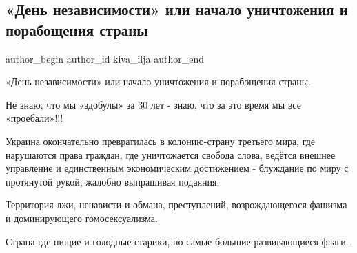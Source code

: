  
 
 
 
 
 
\subsection{«День независимости» или начало уничтожения и порабощения страны}
\label{sec:23_08_2021.fb.kiva_ilja.1.nezavisimost_poraboschenie}
 
\ifcmt
 author_begin
   author_id kiva_ilja
 author_end
\fi

«День независимости» или начало уничтожения и порабощения страны. 

Не знаю, что мы «здобулы» за 30 лет - знаю, что за это время мы все
«проебали»!!!

Украина окончательно превратилась в колонию-страну третьего мира, где
нарушаются  права граждан, где уничтожается  свобода слова, ведётся внешнее
управление и единственным экономическим достижением - блуждание по миру с
протянутой рукой, жалобно выпрашивая подаяния. 

Территория лжи, ненависти и обмана, преступлений, возрождающегося фашизма и
доминирующего гомосексуализма. 

Страна где нищие и голодные старики, но самые большие развивающиеся флаги…
